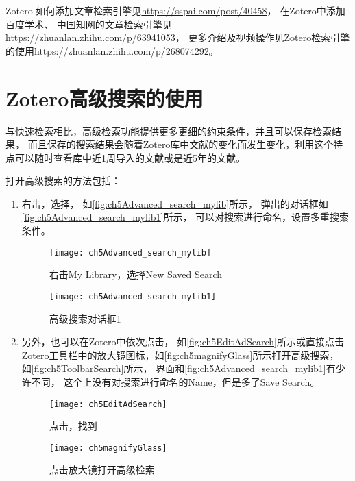 \documentclass[theorem=false,mathfont=none,openany,sub3section]{easybook}
\begin{document}
{Zotero 如何添加文章检索引擎见\url{https://sspai.com/post/40458}，
在Zotero中添加百度学术、
中国知网的文章检索引擎见\url{https://zhuanlan.zhihu.com/p/63941053}，
更多介绍及视频操作见Zotero检索引擎的使用\url{https://zhuanlan.zhihu.com/p/268074292}。

\section{Zotero高级搜索的使用}\label{sec:Advanced_search}
与快速检索相比，高级检索功能提供更多更细的约束条件，并且可以保存检索结果，
而且保存的搜索结果会随着Zotero库中文献的变化而发生变化，利用这个特点可以随时查看库中近1周导入的文献或是近5年的文献。

打开高级搜索的方法包括：
\begin{enumerate}
	\item 右击，选择，
	如\autoref{fig:ch5Advanced_search_mylib}所示，
	弹出的对话框如\autoref{fig:ch5Advanced_search_mylib1}所示，
	可以对搜索进行命名，设置多重搜索条件。
	\begin{figure}[ht]
		\centering
		\texttt{[image: ch5Advanced\_search\_mylib]}
		\caption{右击My Library，选择New Saved Search}
		\label{fig:ch5Advanced_search_mylib}
	\end{figure}
	
	\begin{figure}[ht]
		\centering
		\texttt{[image: ch5Advanced\_search\_mylib1]}
		\caption{高级搜索对话框1}
		\label{fig:ch5Advanced_search_mylib1}
	\end{figure}
	\item 另外，也可以在Zotero中依次点击，
	如\autoref{fig:ch5EditAdSearch}所示或直接点击
	Zotero工具栏中的放大镜图标，如\autoref{fig:ch5magnifyGlass}所示打开高级搜索，
	如\autoref{fig:ch5ToolbarSearch}所示，
	界面和\autoref{fig:ch5Advanced_search_mylib1}有少许不同，
	这个上没有对搜索进行命名的Name，但是多了Save Search。
	

	\begin{figure}[htbp]
		\centering 
		\begin{minipage}[t]{0.4\linewidth}
			\centering
			\texttt{[image: ch5EditAdSearch]}
			\caption{点击，找到}
			\label{fig:ch5EditAdSearch}
		\end{minipage}
		\begin{minipage}[t]{0.4\linewidth}
			\centering
			\texttt{[image: ch5magnifyGlass]}
			\caption{点击放大镜打开高级检索}
			\label{fig:ch5magnifyGlass}
		\end{minipage}
	\end{figure}
	

\end{enumerate}}
\end{document}
